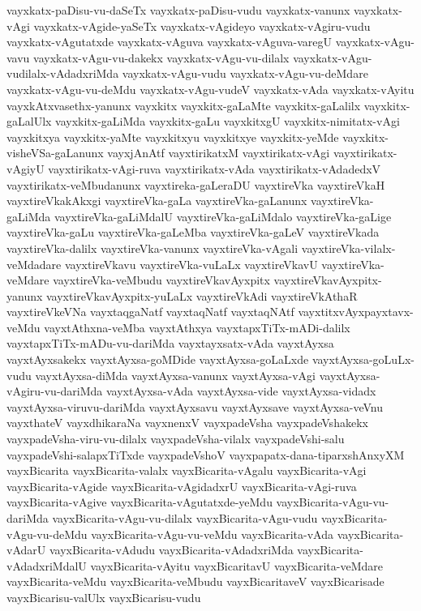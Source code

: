 {vayxkatx-paDisu-vu-daSeTx
vayxkatx-paDisu-vudu
vayxkatx-vanunx
vayxkatx-vAgi
vayxkatx-vAgide-yaSeTx
vayxkatx-vAgideyo
vayxkatx-vAgiru-vudu
vayxkatx-vAgutatxde
vayxkatx-vAguva
vayxkatx-vAguva-varegU
vayxkatx-vAgu-vavu
vayxkatx-vAgu-vu-dakekx
vayxkatx-vAgu-vu-dilalx
vayxkatx-vAgu-vudilalx-vAdadxriMda
vayxkatx-vAgu-vudu
vayxkatx-vAgu-vu-deMdare
vayxkatx-vAgu-vu-deMdu
vayxkatx-vAgu-vudeV
vayxkatx-vAda
vayxkatx-vAyitu
vayxkAtxvasethx-yanunx
vayxkitx
vayxkitx-gaLaMte
vayxkitx-gaLalilx
vayxkitx-gaLalUlx
vayxkitx-gaLiMda
vayxkitx-gaLu
vayxkitxgU
vayxkitx-nimitatx-vAgi
vayxkitxya
vayxkitx-yaMte
vayxkitxyu
vayxkitxye
vayxkitx-yeMde
vayxkitx-visheVSa-gaLanunx
vayxjAnAtf
vayxtirikatxM
vayxtirikatx-vAgi
vayxtirikatx-vAgiyU
vayxtirikatx-vAgi-ruva
vayxtirikatx-vAda
vayxtirikatx-vAdadedxV
vayxtirikatx-veMbudanunx
vayxtireka-gaLeraDU
vayxtireVka
vayxtireVkaH
vayxtireVkakAkxgi
vayxtireVka-gaLa
vayxtireVka-gaLanunx
vayxtireVka-gaLiMda
vayxtireVka-gaLiMdalU
vayxtireVka-gaLiMdalo
vayxtireVka-gaLige
vayxtireVka-gaLu
vayxtireVka-gaLeMba
vayxtireVka-gaLeV
vayxtireVkada
vayxtireVka-dalilx
vayxtireVka-vanunx
vayxtireVka-vAgali
vayxtireVka-vilalx-veMdadare
vayxtireVkavu
vayxtireVka-vuLaLx
vayxtireVkavU
vayxtireVka-veMdare
vayxtireVka-veMbudu
vayxtireVkavAyxpitx
vayxtireVkavAyxpitx-yanunx
vayxtireVkavAyxpitx-yuLaLx
vayxtireVkAdi
vayxtireVkAthaR
vayxtireVkeVNa
vayxtaqgaNatf
vayxtaqNatf
vayxtaqNAtf
vayxtitxvAyxpayxtavx-veMdu
vayxtAthxna-veMba
vayxtAthxya
vayxtapxTiTx-mADi-dalilx
vayxtapxTiTx-mADu-vu-dariMda
vayxtayxsatx-vAda
vayxtAyxsa
vayxtAyxsakekx
vayxtAyxsa-goMDide
vayxtAyxsa-goLaLxde
vayxtAyxsa-goLuLx-vudu
vayxtAyxsa-diMda
vayxtAyxsa-vanunx
vayxtAyxsa-vAgi
vayxtAyxsa-vAgiru-vu-dariMda
vayxtAyxsa-vAda
vayxtAyxsa-vide
vayxtAyxsa-vidadx
vayxtAyxsa-viruvu-dariMda
vayxtAyxsavu
vayxtAyxsave
vayxtAyxsa-veVnu
vayxthateV
vayxdhikaraNa
vayxnenxV
vayxpadeVsha
vayxpadeVshakekx
vayxpadeVsha-viru-vu-dilalx
vayxpadeVsha-vilalx
vayxpadeVshi-salu
vayxpadeVshi-salapxTiTxde
vayxpadeVshoV
vayxpapatx-dana-tiparxshAnxyXM
vayxBicarita
vayxBicarita-valalx
vayxBicarita-vAgalu
vayxBicarita-vAgi
vayxBicarita-vAgide
vayxBicarita-vAgidadxrU
vayxBicarita-vAgi-ruva
vayxBicarita-vAgive
vayxBicarita-vAgutatxde-yeMdu
vayxBicarita-vAgu-vu-dariMda
vayxBicarita-vAgu-vu-dilalx
vayxBicarita-vAgu-vudu
vayxBicarita-vAgu-vu-deMdu
vayxBicarita-vAgu-vu-veMdu
vayxBicarita-vAda
vayxBicarita-vAdarU
vayxBicarita-vAdudu
vayxBicarita-vAdadxriMda
vayxBicarita-vAdadxriMdalU
vayxBicarita-vAyitu
vayxBicaritavU
vayxBicarita-veMdare
vayxBicarita-veMdu
vayxBicarita-veMbudu
vayxBicaritaveV
vayxBicarisade
vayxBicarisu-valUlx
vayxBicarisu-vudu
}

